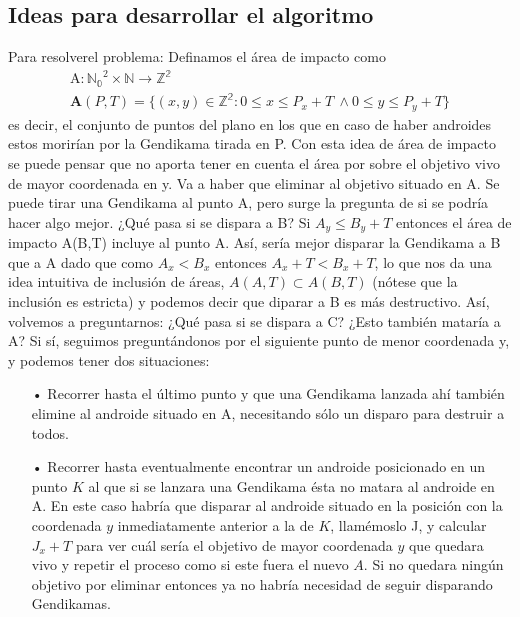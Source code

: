 \documentclass[10pt,a4paper]{article}
\begin{document}
\subsection{Ideas para desarrollar el algoritmo}

Para resolverel problema:
Definamos el área de impacto como
\begin{gather*}
\textrm{A}:\mathbb{N_{0}}^2 \times \mathbb{N} \rightarrow \mathbb{Z^2}\\
 \mathbf{A}(P,T) = \{ (x, y) \in \mathbb{Z^2} : 0 \leq x \leq P_{x}+T ~ \wedge 0 \leq y \leq P_{y}+T \}
\end{gather*}
 es decir, el conjunto de puntos del plano en los que en caso de haber androides estos morirían por la Gendikama tirada en P. Con esta idea de área de impacto se puede pensar que no aporta tener en cuenta el área por sobre el objetivo vivo de mayor coordenada en y.
Va a haber que eliminar al objetivo situado en A. Se puede tirar una Gendikama al punto A, pero surge la pregunta de si se podría hacer algo mejor. ¿Qué pasa si se dispara a B? Si $ A_{y} \leq B_{y}+T$ entonces el área de impacto A(B,T) incluye al punto A. Así, sería mejor disparar la Gendikama a B que a A dado que como  $A_{x} < B_{x}$ entonces  $A_{x}+T < B_{x}+T$, lo que nos da una idea intuitiva de inclusión de áreas, $A(A,T) \subset A(B,T)$ (nótese que la inclusión es estricta) y podemos decir que diparar a B es más destructivo.
Así, volvemos a preguntarnos: ¿Qué pasa si se dispara a C? ¿Esto también mataría a A?
Si sí, seguimos preguntándonos por el siguiente punto de menor coordenada y, y podemos tener dos situaciones:

\begin{itemize}
\item[•] Recorrer hasta el último punto y que una Gendikama lanzada ahí también elimine al androide situado en A, necesitando sólo un disparo para destruir a todos.
\item[•] Recorrer hasta eventualmente encontrar un androide posicionado en un punto $K$ al que si se lanzara una Gendikama ésta no matara al androide en A. En este caso habría que disparar al androide situado en la posición con la coordenada $y$ inmediatamente anterior a la de $K$, llamémoslo J, y calcular $J_{x}+T$ para ver cuál sería el objetivo de mayor coordenada $y$ que quedara vivo  y repetir el proceso como si este fuera el nuevo $A$. Si no quedara ningún objetivo por eliminar entonces ya no habría necesidad de seguir disparando Gendikamas.
\end{itemize}
\\
\end{document}
